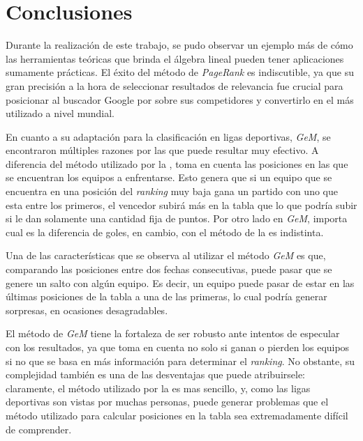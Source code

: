 \section{Conclusiones}

	Durante la realización de este trabajo, se pudo observar un ejemplo más de cómo las herramientas teóricas que brinda el álgebra lineal pueden tener aplicaciones sumamente prácticas. El éxito del método de \emph{PageRank} es indiscutible, ya que su gran precisión a la hora de seleccionar resultados de relevancia fue crucial para posicionar al buscador Google por sobre sus competidores y convertirlo en el más utilizado a nivel mundial.

	En cuanto a su adaptación para la clasificación en ligas deportivas, \emph{GeM}, se encontraron múltiples razones por las que puede resultar muy efectivo. A diferencia del método utilizado por la , toma en cuenta las posiciones en las que se encuentran los equipos a enfrentarse. Esto genera que si un equipo que se encuentra en una posición del \emph{ranking} muy baja gana un partido con uno que esta entre los primeros, el vencedor subirá más en la tabla que lo que podría subir si le dan solamente una cantidad fija de puntos. Por otro lado en \emph{GeM}, importa cual es la diferencia de goles, en cambio, con el método de la  es indistinta.

	Una de las características que se observa al utilizar el método \emph{GeM} es que, comparando las posiciones entre dos fechas consecutivas, puede pasar que se genere un salto con algún equipo. Es decir, un equipo puede pasar de estar en las últimas posiciones de la tabla a una de las primeras, lo cual podría generar sorpresas, en ocasiones desagradables.

	El método de \emph{GeM} tiene la fortaleza de ser robusto ante intentos de especular con los resultados, ya que toma en cuenta no solo si ganan o pierden los equipos si no que se basa en más información para determinar el \emph{ranking}. No obstante, su complejidad también es una de las desventajas que puede atribuirsele: claramente, el método utilizado por la  es mas sencillo, y, como las ligas deportivas son vistas por muchas personas, puede generar problemas que el método utilizado para calcular posiciones en la tabla sea extremadamente difícil de comprender. 

